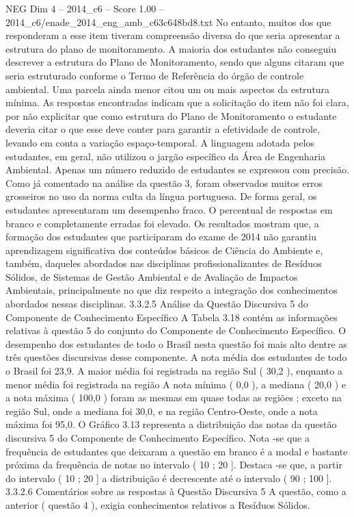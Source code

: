 \begin{textsample}{NEG Dim 4 – 2014\_c6 – Score 1.00 – 2014\_c6/enade\_2014\_eng\_amb\_c63c648bd8.txt}
No entanto, muitos dos que responderam a esse item tiveram compreensão diversa do que seria apresentar a estrutura do plano de monitoramento.
A maioria dos estudantes não conseguiu descrever a estrutura do Plano de Monitoramento, sendo que alguns citaram que seria estruturado conforme o Termo de Referência do órgão de controle ambiental.
Uma parcela ainda menor citou um ou mais aspectos da estrutura mínima.
As respostas encontradas indicam que a solicitação do item não foi clara, por não explicitar que como estrutura do Plano de Monitoramento o estudante deveria citar o que esse deve conter para garantir a efetividade de controle, levando em conta a variação espaço-temporal.
A linguagem adotada pelos estudantes, em geral, não utilizou o jargão específico da Área de Engenharia Ambiental.
Apenas um número reduzido de estudantes se expressou com precisão.
Como já comentado na análise da questão 3, foram observados muitos erros grosseiros no uso da norma culta da língua portuguesa.
De forma geral, os estudantes apresentaram um desempenho fraco.
O percentual de respostas em branco e completamente erradas foi elevado.
Os resultados mostram que, a formação dos estudantes que participaram do exame de 2014 não garantiu aprendizagem significativa dos conteúdos básicos de Ciência do Ambiente e, também, daqueles abordados nas disciplinas profissionalizantes de Resíduos Sólidos, de Sistemas de Gestão Ambiental e de Avaliação de Impactos Ambientais, principalmente no que diz respeito a integração dos conhecimentos abordados nessas disciplinas. 3.3.2.5 Análise da Questão Discursiva 5 do Componente de Conhecimento Específico A Tabela 3.18 contém as informações relativas à questão 5 do conjunto do Componente de Conhecimento Específico.
O desempenho dos estudantes de todo o Brasil nesta questão foi mais alto dentre as três questões discursivas desse componente.
A nota média dos estudantes de todo o Brasil foi 23,9.
A maior média foi registrada na região Sul ( 30,2 ), enquanto a menor média foi registrada na região A nota mínima ( 0,0 ), a mediana ( 20,0 ) e a nota máxima ( 100,0 ) foram as mesmas em quase todas as regiões ; exceto na região Sul, onde a mediana foi 30,0, e na região Centro-Oeste, onde a nota máxima foi 95,0.
O Gráfico 3.13 representa a distribuição das notas da questão discursiva 5 do Componente de Conhecimento Específico.
Nota -se que a frequência de estudantes que deixaram a questão em branco é a modal e bastante próxima da frequência de notas no intervalo ( 10 ; 20 ].
Destaca -se que, a partir do intervalo ( 10 ; 20 ] a distribuição é decrescente até o intervalo ( 90 ; 100 ]. 3.3.2.6 Comentários sobre as respostas à Questão Discursiva 5 A questão, como a anterior ( questão 4 ), exigia conhecimentos relativos a Resíduos Sólidos.

\end{textsample}
